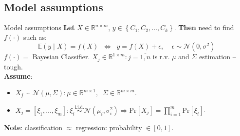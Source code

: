 \documentclass[11pt, aspectratio=169]{beamer}
\newcommand{\iid}{\overset{\text{i.i.d.}}{\sim}}
\newcommand{\emphtext}[1]{\color{black} \textbf{#1}}
\newcommand{\emphmath}[1]{\mathcal{#1}}
\newcommand{\Prob}[1]{\text{Pr}\left[#1\right]}
\newcommand{\Expect}[1]{\mathbb{E} \left(#1\right)}
\newcommand{\N}{\mathcal{N}}
\newcommand{\R}{\mathbb{R}}
\begin{document}
    \subsection{Model assumptions}
    \begin{frame}{Model assumptions}
    	\emphtext{Let} $X \in \R^{n \times m}$, $y \in \left\{C_1, C_2, \ldots, C_k\right\}$. \emphtext{Then} need to find $f(\cdot)$ such as:
    	\begin{equation}
    		\Expect{y \mid X} = f\left(X\right) \;\; \Leftrightarrow \;\; y = f\left(X\right) + \epsilon, \;\;\;\; \epsilon \sim \N\left(0, \sigma^2\right)
    	\end{equation}
    	\noindent  $f\left(\cdot\right) = $ Bayesian Classifier. $X_j \in \R^{1 \times m}: j = \overline{1, n}$ is r.v. $\mu$ and $\Sigma$ estimation -- tough.\\[5pt] 
    	
    	\emphtext{Assume}:\\[5pt]
    	\begin{itemize}
    		\item $X_j \sim \emphmath{N}\left(\mu, \Sigma \right): \mu \in \R^{m \times 1}, \;\; \Sigma \in \R^{m \times m}$.\\[5pt]
    		\item $X_j = \left[\xi_1, \ldots, \xi_m\right]: \xi_i  \iid \emphmath{N}\left(\mu_i, \sigma_i^2\right) \Rightarrow \Prob{X_j} = \prod_{i = 1}^{m} \Prob{\xi_{i}}$.\\[10pt]
    	\end{itemize}
    	
    	\noindent \emphtext{Note}: classification $\approx$ regression: probability $\in [0, 1]$.
    \end{frame}
    
\end{document}
